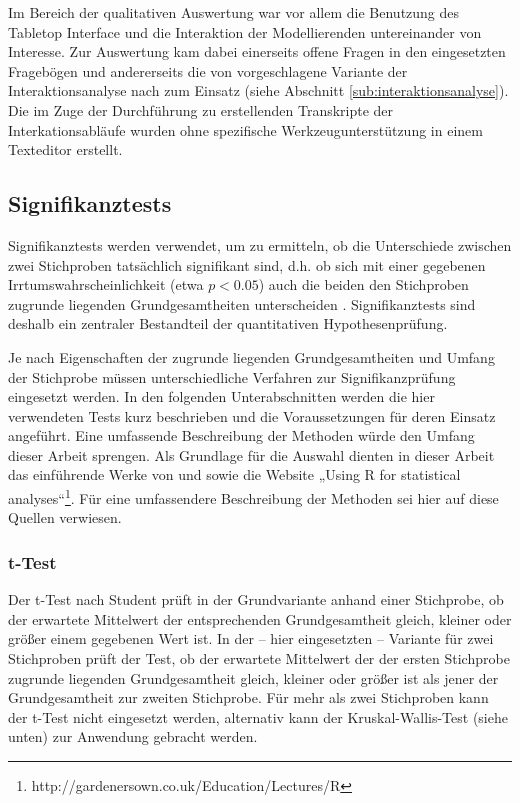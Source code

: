 Im Bereich der qualitativen Auswertung war vor allem die Benutzung des Tabletop Interface und die Interaktion der Modellierenden untereinander von Interesse. Zur Auswertung kam dabei einerseits offene Fragen in den eingesetzten Fragebögen und andererseits die von \citet{Hornecker04} vorgeschlagene Variante der Interaktionsanalyse nach \citet{Jordan95} zum Einsatz (siehe Abschnitt \ref{sub:interaktionsanalyse}). Die im Zuge der Durchführung zu erstellenden Transkripte der Interkationsabläufe wurden ohne spezifische Werkzeugunterstützung in einem Texteditor erstellt.

\subsection{Signifikanztests} %
\label{sub:signifikanztests}

Signifikanztests werden verwendet, um zu ermitteln, ob die Unterschiede zwischen zwei Stichproben tatsächlich signifikant sind, d.h. ob sich mit einer gegebenen Irrtumswahrscheinlichkeit (etwa $p<0.05$) auch die beiden den Stichproben zugrunde liegenden Grundgesamtheiten unterscheiden \citep[][S. 496]{Bortz03}. Signifikanztests sind deshalb ein zentraler Bestandteil der quantitativen Hypothesenprüfung.

Je nach Eigenschaften der zugrunde liegenden Grundgesamtheiten und Umfang der Stichprobe müssen unterschiedliche Verfahren zur Signifikanzprüfung eingesetzt werden. In den folgenden Unterabschnitten werden die hier verwendeten Tests kurz beschrieben und die Voraussetzungen für deren Einsatz angeführt. Eine umfassende Beschreibung der Methoden würde den Umfang dieser Arbeit sprengen. Als Grundlage für die Auswahl dienten in dieser Arbeit das einführende Werke von \citet{Bortz03} und \citet{Duller08} sowie die Website „Using R for statistical analyses“\footnote{http://gardenersown.co.uk/Education/Lectures/R}. Für eine umfassendere Beschreibung der Methoden sei hier auf diese Quellen verwiesen.

\subsubsection{t-Test} %
\label{ssub:t_test}

Der t-Test nach Student prüft in der Grundvariante anhand einer Stichprobe, ob der erwartete Mittelwert der entsprechenden Grundgesamtheit gleich, kleiner oder größer einem gegebenen Wert ist. In der -- hier eingesetzten -- Variante für zwei Stichproben prüft der Test, ob der erwartete Mittelwert der der ersten Stichprobe zugrunde liegenden Grundgesamtheit gleich, kleiner oder größer ist als jener der Grundgesamtheit zur zweiten Stichprobe. Für mehr als zwei Stichproben kann der t-Test nicht eingesetzt werden, alternativ kann der Kruskal-Wallis-Test (siehe unten) zur Anwendung gebracht werden.


